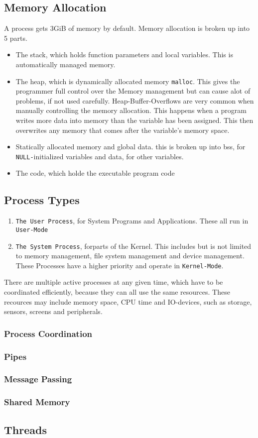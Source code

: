 \documentclass[a4paper, 11pt]{article}
\begin{document}
    \subsection{Memory Allocation}
    A process gets 3GiB of memory by default. Memory allocation is broken up into 5 parts.
    \begin{itemize}
      \item The stack, which holds function parameters and local variables. This is automatically managed memory.
      \item The heap, which is dynamically allocated memory \texttt{malloc}. This gives the programmer full control over the Memory management
            but can cause alot of problems, if not used carefully. Heap-Buffer-Overflows are very common when manually controlling the memory
            allocation. This happens when a program writes more data into memory than the variable has been assigned. This then overwrites any 
            memory that comes after the variable's memory space.
      \item Statically allocated memory and global data. this is broken up into bss, for \lstinline{NULL-}initialized variables and data,
            for other variables.
      \item The code, which holde the executable program code
    \end{itemize}

    \subsection{Process Types}
    \begin{enumerate}
      \item \texttt{The User Process}, for System Programs and Applications. These all run in \texttt{User-Mode}
      \item \texttt{The System Process}, forparts of the Kernel. This includes but is not limited
            to memory management, file system management and device management. These Processes have a higher
            priority and operate in \texttt{Kernel-Mode}.
    \end{enumerate}
    There are multiple active processes at any given time, which have to be coordinated efficiently, because they can all
    use the same resources. These recources may include memory space, CPU time and IO-devices, such as storage, sensors, screens and peripherals.

    \subsubsection{Process Coordination}

    \subsubsection{Pipes}
    \subsubsection{Message Passing}
    \subsubsection{Shared Memory}

    \subsection{Threads}
\end{document}
